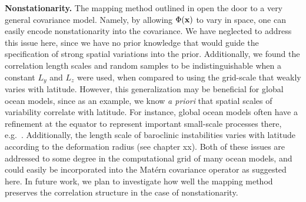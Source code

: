 \noindent\textbf{Nonstationarity.}
The mapping method outlined in
open the door to a very general covariance model.
Namely, by allowing $\Phi(\mathbf{x})$ to vary in space, one can easily encode
nonstationarity into the covariance.
We have neglected to address this issue here, since we have no prior knowledge
that would guide the specification of strong spatial variations into the prior.
Additionally, we found the correlation length scales and random samples to be
indistinguishable when a constant $L_y$ and $L_z$ were used, when compared to
using the grid-scale that weakly varies with latitude.
However, this generalization may be beneficial for global ocean models, since
as an example,
we know \textit{a priori} that spatial scales of variability correlate with
latitude.
For instance, global ocean models often have a refinement at the equator to
represent important small-scale processes there, e.g.\ \citep{forgetECCOv4}.
Additionally, the length scale of baroclinic instabilities varies with latitude
according to the deformation radius (see chapter xx).
Both of these issues are addressed to some degree in the computational grid
of many ocean models, and could easily be incorporated into the Mat\'ern
covariance operator as suggested here.
In future work, we plan to investigate how well the mapping method preserves the
correlation structure in the case of nonstationarity.
